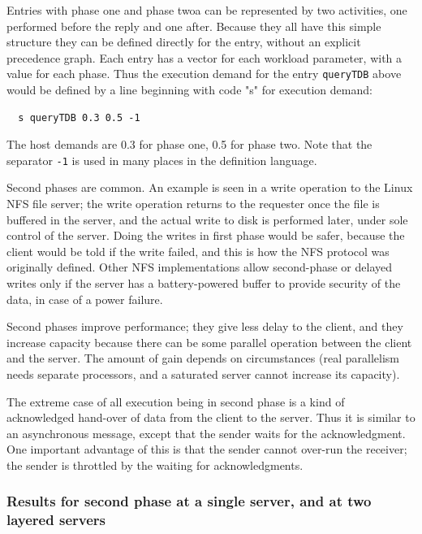 \documentclass[11pt]{article}
\begin{document}
Entries with phase one and phase twoa can be represented by two
activities, one performed before the reply and one after. Because they
all have this simple structure they can be defined directly for the
entry, without an explicit precedence graph. Each entry has a vector
for each workload parameter, with a value for each phase. Thus the
execution demand for the entry \texttt{queryTDB} above would be defined by a
line beginning with code "s" for execution demand:  
\begin{verbatim}
  s queryTDB 0.3 0.5 -1
\end{verbatim}
The host demands are 0.3 for phase one, 0.5 for phase two. Note that the
separator \texttt{-1} is used in many places in the definition language.

Second phases are common. An example is seen in a write operation to
the Linux NFS file server; the write operation returns to the
requester once the file is buffered in the server, and the actual
write to disk is performed later, under sole control of the server.
Doing the writes in first phase would be safer, because the client
would be told if the write failed, and this is how the NFS protocol
was originally defined. Other NFS implementations allow second-phase
or delayed writes only if the server has a battery-powered buffer to
provide security of the data, in case of a power failure.

Second phases improve performance; they give less delay to the client,
and they increase capacity because there can be some parallel
operation between the client and the server. The amount of gain
depends on circumstances (real parallelism needs separate processors,
and a saturated server cannot increase its capacity).

The extreme case of all execution being in second phase is a kind of
acknowledged hand-over of data from the client to the server. Thus it
is similar to an asynchronous message, except that the sender waits
for the acknowledgment. One important advantage of this is that the
sender cannot over-run the receiver; the sender is throttled by the
waiting for acknowledgments.

\subsubsection{Results for second phase at a single server, and at two layered
servers}
\end{document}
